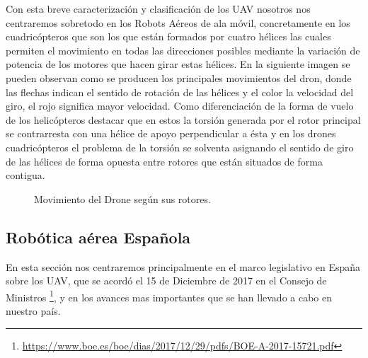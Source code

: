 \hspace{1cm} Con esta breve caracterización y clasificación de los UAV nosotros nos centraremos sobretodo en los Robots Aéreos de ala móvil, concretamente en los cuadricópteros que son los que están formados por cuatro hélices las cuales permiten el movimiento en todas las direcciones posibles mediante la variación de potencia de los motores que hacen girar estas hélices. En la siguiente imagen se pueden observan como se producen los principales movimientos del dron, donde las flechas indican el sentido de rotación de las hélices y el color la velocidad del giro, el rojo significa mayor velocidad. Como diferenciación de la forma de vuelo de los helicópteros destacar que en estos la torsión generada por el rotor principal se contrarresta con una hélice de apoyo perpendicular a ésta y en los drones cuadricópteros el problema de la torsión se solventa asignando el sentido de giro de las hélices de forma opuesta entre rotores que están situados de forma contigua.

\begin{figure}[H]
 \centering
 \caption{Movimiento del Drone según sus rotores.}
 \label{f:Moviento en drones.}
\end{figure}

\subsection{Robótica aérea Española}
\hspace{1cm} En esta sección nos centraremos principalmente en el marco legislativo en España sobre los UAV, que se acordó el 15 de Diciembre de 2017 en el Consejo de Ministros \footnote{\url{https://www.boe.es/boe/dias/2017/12/29/pdfs/BOE-A-2017-15721.pdf}}, y en los avances mas importantes que se han llevado a cabo en nuestro país. 


